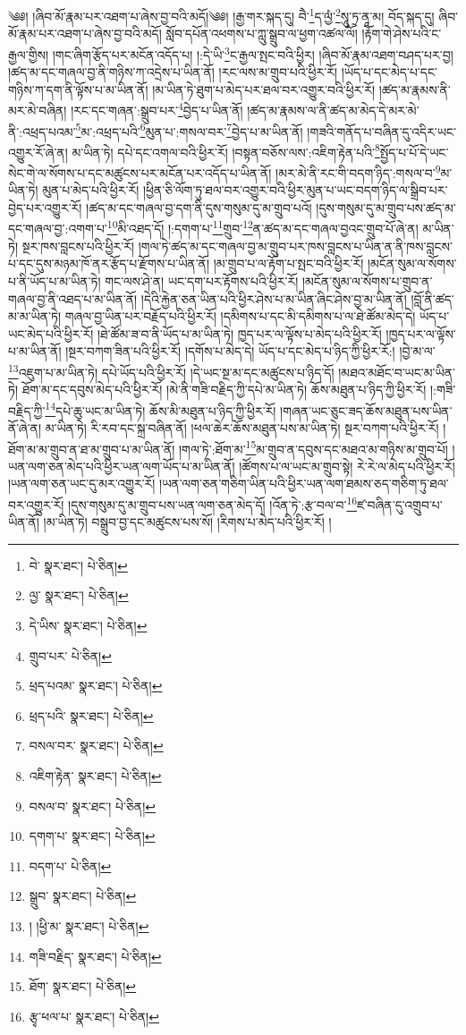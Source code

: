 \setcounter{footnote}{0} 
༄༅། །ཞིབ་མོ་རྣམ་པར་འཐག་པ་ཞེས་བྱ་བའི་མདོ།༄༅། །རྒྱ་གར་སྐད་དུ། བཻ་\footnote{བེ་  སྣར་ཐང་།  པེ་ཅིན། }ད་ལྱཾ་\footnote{ལྱ་  སྣར་ཐང་།  པེ་ཅིན། }སཱུ་ཏྲ་ནཱ་མ། བོད་སྐད་དུ། ཞིབ་མོ་རྣམ་པར་འཐག་པ་ཞེས་བྱ་བའི་མདོ། སློབ་དཔོན་འཕགས་པ་ཀླུ་སྒྲུབ་ལ་ཕྱག་འཚལ་ལོ། །རྟོག་གེ་ཤེས་པའི་ང་རྒྱལ་གྱིས། །གང་ཞིག་རྩོད་པར་མངོན་འདོད་པ། །:དེ་ཡི་\footnote{དེ་ཡིས་  སྣར་ཐང་།  པེ་ཅིན། }ང་རྒྱལ་སྤང་བའི་ཕྱིར། །ཞིབ་མོ་རྣམ་འཐག་བཤད་པར་བྱ། །ཚད་མ་དང་གཞལ་བྱ་ནི་གཉིས་ཀ་འདྲེས་པ་ཡིན་ནོ། །རང་ལས་མ་གྲུབ་པའི་ཕྱིར་རོ། །ཡོད་པ་དང་མེད་པ་དང་གཉིས་ཀ་དག་ནི་ལྟོས་པ་མ་ཡིན་ནོ། །མ་ཡིན་ཏེ་ཐུག་པ་མེད་པར་ཐལ་བར་འགྱུར་བའི་ཕྱིར་རོ། །ཚད་མ་རྣམས་ནི་མར་མེ་བཞིན། །རང་དང་གཞན་:སྒྲུབ་པར་\footnote{གྲུབ་པར་  པེ་ཅིན། }བྱེད་པ་ཡིན་ནོ། །ཚད་མ་རྣམས་ལ་ནི་ཚད་མ་མེད་དེ་མར་མེ་ནི་:འཕྲད་པའམ་\footnote{ཕྲད་པའམ་  སྣར་ཐང་།  པེ་ཅིན། }མ་:འཕྲད་པའི་\footnote{ཕྲད་པའི་  སྣར་ཐང་།  པེ་ཅིན། }མུན་པ་:གསལ་བར་\footnote{བསལ་བར་  སྣར་ཐང་།  པེ་ཅིན། }བྱེད་པ་མ་ཡིན་ནོ། །གཟའི་གནོད་པ་བཞིན་དུ་འདིར་ཡང་འགྱུར་རོ་ཞེ་ན། མ་ཡིན་ཏེ། དཔེ་དང་འགལ་བའི་ཕྱིར་རོ། །བསྟན་བཅོས་ལས་:འཇིག་རྟེན་པའི་\footnote{འཇིག་རྟེན་  སྣར་ཐང་།  པེ་ཅིན། }སྤྱོད་པ་པོ་དེ་ཡང་སེང་གེ་ལ་སོགས་པ་དང་མཚུངས་པར་མངོན་པར་འདོད་པ་ཡིན་ནོ། །མར་མེ་ནི་རང་གི་བདག་ཉིད་:གསལ་བ་\footnote{བསལ་བ་  སྣར་ཐང་།  པེ་ཅིན། }མ་ཡིན་ཏེ། མུན་པ་མེད་པའི་ཕྱིར་རོ། །ཕྱིན་ཅི་ལོག་ཏུ་ཐལ་བར་འགྱུར་བའི་ཕྱིར་མུན་པ་ཡང་བདག་ཉིད་ལ་སྒྲིབ་པར་བྱེད་པར་འགྱུར་རོ། །ཚད་མ་དང་གཞལ་བྱ་དག་ནི་དུས་གསུམ་དུ་མ་གྲུབ་པའོ། །དུས་གསུམ་དུ་མ་གྲུབ་པས་ཚད་མ་དང་གཞལ་བྱ་:འགག་པ་\footnote{དགག་པ་  སྣར་ཐང་།  པེ་ཅིན། }མི་འཐད་དོ། །:དགག་པ་\footnote{བདག་པ་  པེ་ཅིན། }གྲུབ་\footnote{སྒྲུབ་  སྣར་ཐང་།  པེ་ཅིན། }ན་ཚད་མ་དང་གཞལ་བྱའང་གྲུབ་པོ་ཞེ་ན། མ་ཡིན་ཏེ། སྔར་ཁས་བླངས་པའི་ཕྱིར་རོ། །གལ་ཏེ་ཚད་མ་དང་གཞལ་བྱ་མ་གྲུབ་པར་ཁས་བླངས་པ་ཡིན་ན་ནི་ཁས་བླངས་པ་དང་དུས་མཉམ་ཁོ་ནར་རྩོད་པ་རྫོགས་པ་ཡིན་ནོ། །མ་གྲུབ་པ་ལ་རྟོག་པ་སྤང་བའི་ཕྱིར་རོ། །མངོན་སུམ་ལ་སོགས་པ་ནི་ཡོད་པ་མ་ཡིན་ཏེ། གང་ལས་ཤེ་ན། ཡང་དག་པར་རྟོགས་པའི་ཕྱིར་རོ། །མངོན་སུམ་ལ་སོགས་པ་གྲུབ་ན་གཞལ་བྱ་ནི་འཐད་པ་མ་ཡིན་ནོ། །དེའི་རྐྱེན་ཅན་ཡིན་པའི་ཕྱིར་ཤེས་པ་མ་ཡིན་ཞིང་ཤེས་བྱ་མ་ཡིན་ནོ། །བློ་ནི་ཚད་མ་མ་ཡིན་ཏེ། གཞལ་བྱ་ཡིན་པར་བརྗོད་པའི་ཕྱིར་རོ། །དམིགས་པ་དང་མི་དམིགས་པ་ལ་ཐེ་ཚོམ་མེད་དེ། ཡོད་པ་ཡང་མེད་པའི་ཕྱིར་རོ། །ཐེ་ཚོམ་ཟ་བ་ནི་ཡོད་པ་མ་ཡིན་ཏེ། ཁྱད་པར་ལ་ལྟོས་པ་མེད་པའི་ཕྱིར་རོ། །ཁྱད་པར་ལ་ལྟོས་པ་མ་ཡིན་ནོ། །སྔར་བཀག་ཟིན་པའི་ཕྱིར་རོ། །དགོས་པ་མེད་དེ། ཡོད་པ་དང་མེད་པ་ཉིད་ཀྱི་ཕྱིར་རོ:། །བྱེ་མ་ལ་\footnote{། །ཕྱི་མ་  སྣར་ཐང་།  པེ་ཅིན། }འཇུག་པ་མ་ཡིན་ཏེ། དཔེ་ཡོད་པའི་ཕྱིར་རོ། །དེ་ཡང་སྔ་མ་དང་མཚུངས་པ་ཉིད་དོ། །མཐའ་མཐོང་བ་ཡང་མ་ཡིན་ཏེ། ཐོག་མ་དང་དབུས་མེད་པའི་ཕྱིར་རོ། །མེ་ནི་གཟི་བརྗིད་ཀྱི་དཔེ་མ་ཡིན་ཏེ། ཆོས་མཐུན་པ་ཉིད་ཀྱི་ཕྱིར་རོ། །:གཟི་བརྗིད་ཀྱི་\footnote{གཟི་བརྗིད་  སྣར་ཐང་།  པེ་ཅིན། }དཔེ་ཆུ་ཡང་མ་ཡིན་ཏེ། ཆོས་མི་མཐུན་པ་ཉིད་ཀྱི་ཕྱིར་རོ། །གཞན་ཡང་ཅུང་ཟད་ཆོས་མཐུན་པས་ཡིན་ནོ་ཞེ་ན། མ་ཡིན་ཏེ། རི་རབ་དང་སྐྲ་བཞིན་ནོ། །ཕལ་ཆེར་ཆོས་མཐུན་པས་མ་ཡིན་ཏེ། སྔར་བཀག་པའི་ཕྱིར་རོ། །ཐོག་མ་མ་གྲུབ་ན་ཐ་མ་གྲུབ་པ་མ་ཡིན་ནོ། །གལ་ཏེ་:ཐོག་མ་\footnote{ཐོག་  སྣར་ཐང་།  པེ་ཅིན། }མ་གྲུབ་ན་དབུས་དང་མཐའ་མ་གཉིས་མ་གྲུབ་པོ། །ཡན་ལག་ཅན་མེད་པའི་ཕྱིར་ཡན་ལག་ཡོད་པ་མ་ཡིན་ནོ། །ཚོགས་པ་ལ་ཡང་མ་གྲུབ་སྟེ། རེ་རེ་ལ་མེད་པའི་ཕྱིར་རོ། །ཡན་ལག་ཅན་ཡང་དུ་མར་འགྱུར་རོ། །ཡན་ལག་ཅན་གཅིག་ཡིན་པའི་ཕྱིར་ཡན་ལག་ཐམས་ཅད་གཅིག་ཏུ་ཐལ་བར་འགྱུར་རོ། །དུས་གསུམ་དུ་མ་གྲུབ་པས་ཡན་ལག་ཅན་མེད་དོ། །འོན་ཏེ་:རྩ་བལ་བ་\footnote{རྩྭ་ཕལ་པ་  སྣར་ཐང་།  པེ་ཅིན། }ཛ་བཞིན་དུ་འགྲུབ་པ་ཡིན་ནོ། །མ་ཡིན་ཏེ། བསྒྲུབ་བྱ་དང་མཚུངས་པས་སོ། །རིགས་པ་མེད་པའི་ཕྱིར་རོ། །
